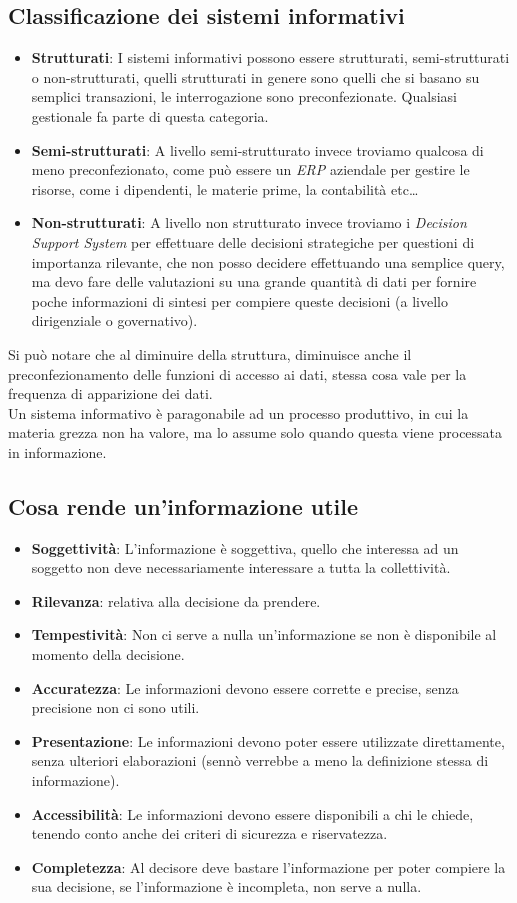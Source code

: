 \documentclass[a4paper,12pt]{report}
\begin{document}
\subsection{Classificazione dei sistemi informativi}
\begin{itemize}
	\item \textbf{Strutturati}: I sistemi informativi possono essere strutturati, semi-strutturati o non-strutturati, quelli strutturati in genere sono quelli che si basano su semplici transazioni, le interrogazione sono preconfezionate. Qualsiasi gestionale fa parte di questa categoria.
	\item \textbf{Semi-strutturati}: A livello semi-strutturato invece troviamo qualcosa di meno preconfezionato, come può essere un \textit{ERP} aziendale per gestire le risorse, come i dipendenti, le materie prime, la contabilità etc\dots
	\item \textbf{Non-strutturati}: A livello non strutturato invece troviamo i \textit{Decision Support System} per effettuare delle decisioni strategiche per questioni di importanza rilevante, che non posso decidere effettuando una semplice query, ma devo fare delle valutazioni su una grande quantità di dati per fornire poche informazioni di sintesi per compiere queste decisioni (a livello dirigenziale o governativo).
\end{itemize}
Si può notare che al diminuire della struttura, diminuisce anche il preconfezionamento delle funzioni di accesso ai dati, stessa cosa vale per la frequenza di apparizione dei dati.\\
Un sistema informativo è paragonabile ad un processo produttivo, in cui la materia grezza non ha valore, ma lo assume solo quando questa viene processata in informazione.
\subsection{Cosa rende un'informazione utile}
\begin{itemize}
	\item \textbf{Soggettività}: L'informazione è soggettiva, quello che interessa ad un soggetto non deve necessariamente interessare a tutta la collettività.
	\item \textbf{Rilevanza}: relativa alla decisione da prendere.
	\item \textbf{Tempestività}: Non ci serve a nulla un'informazione se non è disponibile al momento della decisione.
	\item \textbf{Accuratezza}: Le informazioni devono essere corrette e precise, senza precisione non ci sono utili.
	\item \textbf{Presentazione}: Le informazioni devono poter essere utilizzate direttamente, senza ulteriori elaborazioni (sennò verrebbe a meno la definizione stessa di informazione).
	\item \textbf{Accessibilità}: Le informazioni devono essere disponibili a chi le chiede, tenendo conto anche dei criteri di sicurezza e riservatezza.
	\item \textbf{Completezza}: Al decisore deve bastare l'informazione per poter compiere la sua decisione, se l'informazione è incompleta, non serve a nulla.
\end{itemize}
\end{document}
